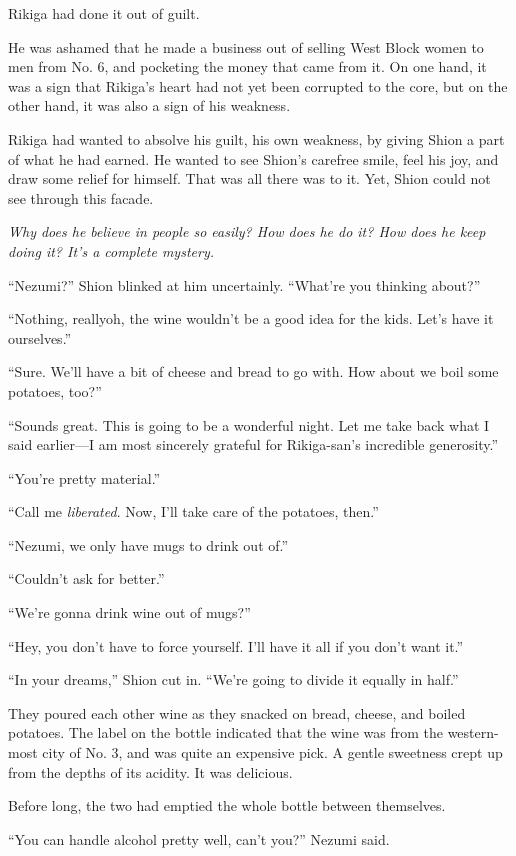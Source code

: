 Rikiga had done it out of guilt.

He was ashamed that he made a business out of selling West Block women
to men from No. 6, and pocketing the money that came from it. On one
hand, it was a sign that Rikiga's heart had not yet been corrupted to
the core, but on the other hand, it was also a sign of his weakness.

Rikiga had wanted to absolve his guilt, his own weakness, by giving
Shion a part of what he had earned. He wanted to see Shion's carefree
smile, feel his joy, and draw some relief for himself. That was all
there was to it. Yet, Shion could not see through this facade.

\emph{Why does he believe in people so easily? How does he do it?
How does he keep doing it? It's a complete mystery.}

``Nezumi?'' Shion blinked at him uncertainly. ``What're you thinking
about?''

``Nothing, really\el oh, the wine wouldn't be a good idea for the kids.
Let's have it ourselves.''

``Sure. We'll have a bit of cheese and bread to go with. How about we
boil some potatoes, too?''

``Sounds great. This is going to be a wonderful night. Let me take back
what I said earlier---I am most sincerely grateful for Rikiga-san's
incredible generosity.''

``You're pretty material.''

``Call me \emph{liberated}. Now, I'll take care of the potatoes, then.''

``Nezumi, we only have mugs to drink out of.''

``Couldn't ask for better.''

``We're gonna drink wine out of mugs?''

``Hey, you don't have to force yourself. I'll have it all if you don't
want it.''

``In your dreams,'' Shion cut in. ``We're going to divide it equally in
half.''

They poured each other wine as they snacked on bread, cheese, and boiled
potatoes. The label on the bottle indicated that the wine was from the
western-most city of No. 3, and was quite an expensive pick. A gentle
sweetness crept up from the depths of its acidity. It was delicious.

Before long, the two had emptied the whole bottle between themselves.

``You can handle alcohol pretty well, can't you?'' Nezumi said.

